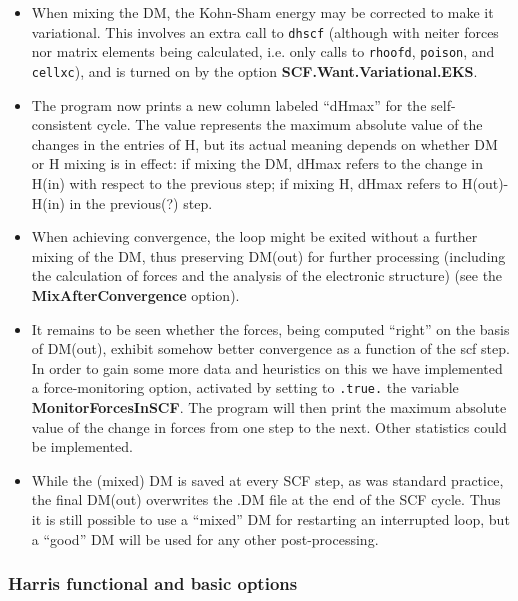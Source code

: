 \begin{itemize}
\item When mixing the DM, the Kohn-Sham energy may be corrected to make it
  variational. This involves an extra call to \texttt{dhscf} (although
  with neiter forces nor matrix elements being calculated, i.e. only
  calls to \texttt{rhoofd}, \texttt{poison}, and \texttt{cellxc}), and is
  turned on by the option \textbf{SCF.Want.Variational.EKS}.


\item The program now prints a new column labeled ``dHmax'' for the
  self-consistent cycle. The value represents the maximum absolute
  value of the changes in the entries of H, but its actual meaning
  depends on whether DM or H mixing is in effect: if mixing the DM,
  dHmax refers to the change in H(in) with respect to the previous
  step; if mixing H, dHmax refers to H(out)-H(in) in the previous(?)
  step.

\item When achieving convergence, the loop might be exited without a further
  mixing of the DM, thus preserving DM(out) for further processing
  (including the calculation of forces and the analysis of the
  electronic structure) (see the \textbf{MixAfterConvergence} option).


\item It remains to be seen whether the forces, being computed
  ``right'' on the basis of DM(out), exhibit somehow better convergence
  as a function of the scf step. In order to gain some more data and
  heuristics on this we have implemented a force-monitoring option,
  activated by setting to \texttt{.true.} the variable \textbf{MonitorForcesInSCF}. The program will then print the maximum
  absolute value of the change in forces from one step to the
  next. Other statistics could be implemented.

\item While the (mixed) DM is saved at every SCF step, as was standard
  practice, the final DM(out) overwrites the .DM file at the end of
  the SCF cycle. Thus it is still possible to use a ``mixed'' DM for
  restarting an interrupted loop, but a ``good'' DM will be used for
  any other post-processing.

\end{itemize}


\subsubsection{Harris functional and basic options}

